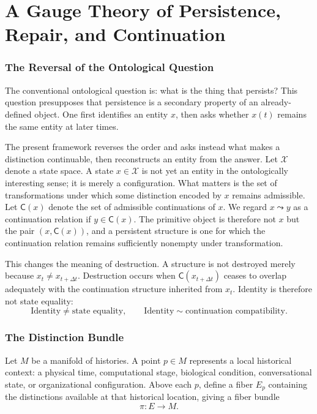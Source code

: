 \documentclass[11pt]{article}
\newcommand{\C}{\mathsf{C}}
\begin{document}
\tableofcontents

\part{A Gauge Theory of Persistence, Repair, and Continuation}

\section{The Reversal of the Ontological Question}

The conventional ontological question is: what is the thing that persists? This question presupposes that persistence is a secondary property of an already-defined object. One first identifies an entity $x$, then asks whether $x(t)$ remains the same entity at later times.

The present framework reverses the order and asks instead what makes a distinction continuable, then reconstructs an entity from the answer. Let $\mathcal{X}$ denote a state space. A state $x \in \mathcal{X}$ is not yet an entity in the ontologically interesting sense; it is merely a configuration. What matters is the set of transformations under which some distinction encoded by $x$ remains admissible. Let $\C(x)$ denote the set of admissible continuations of $x$. We regard $x \leadsto y$ as a continuation relation if $y \in \C(x)$. The primitive object is therefore not $x$ but the pair $(x, \C(x))$, and a persistent structure is one for which the continuation relation remains sufficiently nonempty under transformation.

This changes the meaning of destruction. A structure is not destroyed merely because $x_t \neq x_{t+\Delta t}$. Destruction occurs when $\C(x_{t+\Delta t})$ ceases to overlap adequately with the continuation structure inherited from $x_t$. Identity is therefore not state equality:
\[
\text{Identity} \neq \text{state equality}, \qquad \text{Identity} \sim \text{continuation compatibility}.
\]

\section{The Distinction Bundle}

Let $M$ be a manifold of histories. A point $p \in M$ represents a local historical context: a physical time, computational stage, biological condition, conversational state, or organizational configuration. Above each $p$, define a fiber $E_p$ containing the distinctions available at that historical location, giving a fiber bundle
\[
\pi : E \rightarrow M.
\]
\end{document}
